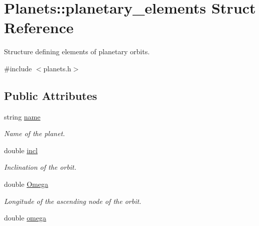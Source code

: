 \hypertarget{struct_planets_1_1planetary__elements}{\section{Planets\-:\-:planetary\-\_\-elements Struct Reference}
\label{struct_planets_1_1planetary__elements}
}


Structure defining elements of planetary orbits.  




{\ttfamily \#include $<$planets.\-h$>$}

\subsection*{Public Attributes}
\begin{DoxyCompactItemize}
\item 
\hypertarget{struct_planets_1_1planetary__elements_aee6eeb70cffb2197df9a7faaaf04d9dd}{string \hyperlink{struct_planets_1_1planetary__elements_aee6eeb70cffb2197df9a7faaaf04d9dd}{name}}\label{struct_planets_1_1planetary__elements_aee6eeb70cffb2197df9a7faaaf04d9dd}

\begin{DoxyCompactList}\small\item\em Name of the planet. \end{DoxyCompactList}\item 
\hypertarget{struct_planets_1_1planetary__elements_ac2934379349f65bb52f794cf6ebcde33}{double \hyperlink{struct_planets_1_1planetary__elements_ac2934379349f65bb52f794cf6ebcde33}{incl}}\label{struct_planets_1_1planetary__elements_ac2934379349f65bb52f794cf6ebcde33}

\begin{DoxyCompactList}\small\item\em Inclination of the orbit. \end{DoxyCompactList}\item 
\hypertarget{struct_planets_1_1planetary__elements_a4fffd988e0d0eed7fa64f29eaff57e07}{double \hyperlink{struct_planets_1_1planetary__elements_a4fffd988e0d0eed7fa64f29eaff57e07}{Omega}}\label{struct_planets_1_1planetary__elements_a4fffd988e0d0eed7fa64f29eaff57e07}

\begin{DoxyCompactList}\small\item\em Longitude of the ascending node of the orbit. \end{DoxyCompactList}\item 
\hypertarget{struct_planets_1_1planetary__elements_a2d19dc76c210c08d0802f5e8b88de476}{double \hyperlink{struct_planets_1_1planetary__elements_a2d19dc76c210c08d0802f5e8b88de476}{omega}}\label{struct_planets_1_1planetary__elements_a2d19dc76c210c08d0802f5e8b88de476}


\end{DoxyCompactItemize}
